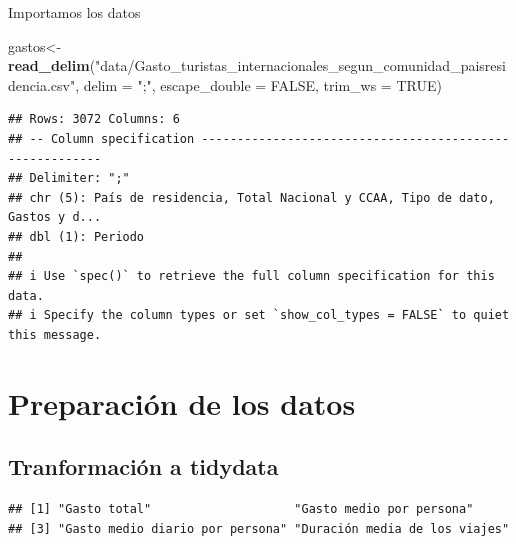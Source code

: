 \documentclass[notspecified,article,submit,moreauthors,pdftex]{Definitions/mdpi}
\newenvironment{Shaded}{\begin{snugshade}}{\end{snugshade}}
\newcommand{\AttributeTok}[1]{\textcolor[rgb]{0.13,0.29,0.53}{#1}}
\newcommand{\ConstantTok}[1]{\textcolor[rgb]{0.56,0.35,0.01}{#1}}
\newcommand{\FunctionTok}[1]{\textcolor[rgb]{0.13,0.29,0.53}{\textbf{#1}}}
\newcommand{\NormalTok}[1]{#1}
\newcommand{\OtherTok}[1]{\textcolor[rgb]{0.56,0.35,0.01}{#1}}
\newcommand{\SpecialCharTok}[1]{\textcolor[rgb]{0.81,0.36,0.00}{\textbf{#1}}}
\newcommand{\StringTok}[1]{\textcolor[rgb]{0.31,0.60,0.02}{#1}}
\begin{document}
Importamos los datos

\begin{Shaded}
\begin{Highlighting}[]
\NormalTok{gastos}\OtherTok{\textless{}{-}} \FunctionTok{read\_delim}\NormalTok{(}\StringTok{"data/Gasto\_turistas\_internacionales\_segun\_comunidad\_paisresidencia.csv"}\NormalTok{,  }\AttributeTok{delim =} \StringTok{";"}\NormalTok{, }\AttributeTok{escape\_double =} \ConstantTok{FALSE}\NormalTok{, }\AttributeTok{trim\_ws =} \ConstantTok{TRUE}\NormalTok{)}
\end{Highlighting}
\end{Shaded}

\begin{verbatim}
## Rows: 3072 Columns: 6
## -- Column specification --------------------------------------------------------
## Delimiter: ";"
## chr (5): País de residencia, Total Nacional y CCAA, Tipo de dato, Gastos y d...
## dbl (1): Periodo
## 
## i Use `spec()` to retrieve the full column specification for this data.
## i Specify the column types or set `show_col_types = FALSE` to quiet this message.
\end{verbatim}

\section{Preparación de los datos}\label{preparaciuxf3n-de-los-datos}

\subsection{Tranformación a tidydata}\label{tranformaciuxf3n-a-tidydata}

\begin{Shaded}
\end{Shaded}

\begin{verbatim}
## [1] "Gasto total"                    "Gasto medio por persona"       
## [3] "Gasto medio diario por persona" "Duración media de los viajes"
\end{verbatim}
\end{document}
